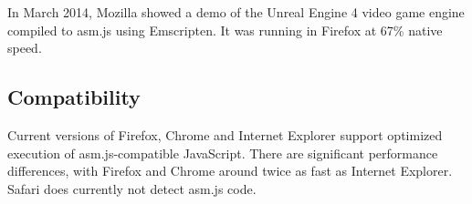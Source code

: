 In March 2014, Mozilla showed a demo of the Unreal Engine 4 video game engine compiled to asm.js using Emscripten. It was running in Firefox at 67\% native speed. \cite{ue4ff}


\subsection{Compatibility}

Current versions of Firefox, Chrome and Internet Explorer support optimized execution of asm.js-compatible JavaScript. There are significant performance differences, with Firefox and Chrome around twice as fast as Internet Explorer. Safari does currently not detect asm.js code. \cite{asm.js_comp}
